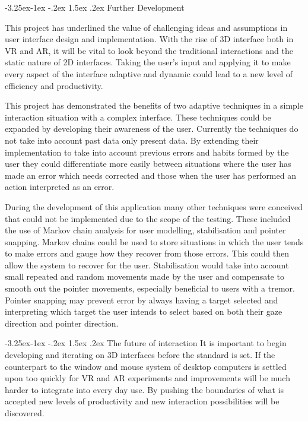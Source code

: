 \documentclass[12pt]{article}
\makeatletter
\renewcommand{\subsection}{\@startsection{subsection}{2}{\z@}%
             {-3.25ex\@plus -1ex \@minus -.2ex}%
             {1.5ex \@plus .2ex}%
             {\normalfont\large\scshape\bfseries}}
\makeatother
\begin{document}
\subsection{Further Development}

This project has underlined the value of challenging ideas and assumptions in user interface design and implementation. With the rise of 3D interface both in VR and AR, it will be vital to look beyond the traditional interactions and the static nature of 2D interfaces. Taking the user's input and applying it to make every aspect of the interface adaptive and dynamic could lead to a new level of efficiency and productivity.

This project has demonstrated the benefits of two adaptive techniques in a simple interaction situation with a complex interface. These techniques could be expanded by developing their awareness of the user. Currently the techniques do not take into account past data only present data. By extending their implementation to take into account previous errors and habits formed by the user they could differentiate more easily between situations where the user has made an error which needs corrected and those when the user has performed an action interpreted as an error. 

During the development of this application many other techniques were conceived that could not be implemented due to the scope of the testing. These included the use of Markov chain analysis for user modelling, stabilisation and pointer snapping. Markov chains could be used to store situations in which the user tends to make errors and gauge how they recover from those errors. This could then allow the system to recover for the user. Stabilisation would take into account small repeated and random movements made by the user and compensate to smooth out the pointer movements, especially beneficial to users with a tremor. Pointer snapping may prevent error by always having a target selected and interpreting which target the user intends to select based on both their gaze direction and pointer direction.

\subsection{The future of interaction}
It is important to begin developing and iterating on 3D interfaces before the standard is set. If the counterpart to the window and mouse system of desktop computers is settled upon too quickly for VR and AR experiments and improvements will be much harder to integrate into every day use. By pushing the boundaries of what is accepted new levels of productivity and new interaction possibilities will be discovered. 
\end{document}
